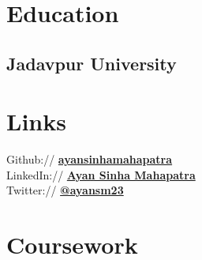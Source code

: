 \documentclass[]{deedy-resume-openfont}
\begin{document}
%
%
\lastupdated

%
%

%
%

\begin{minipage}[t]{0.33\textwidth} 


\section{Education} 

\subsection{Jadavpur University}
\sectionsep


\section{Links} 
Github:// \href{https://github.com/ayansinhamahapatra}{\bf ayansinhamahapatra} \\
LinkedIn://  \href{https://www.linkedin.com/in/ayansinhaju/}{\bf Ayan Sinha Mahapatra} \\
Twitter://  \href{https://twitter.com/ayansm23}{\bf @ayansm23} \\


\section{Coursework}


\end{minipage}
\end{document}
